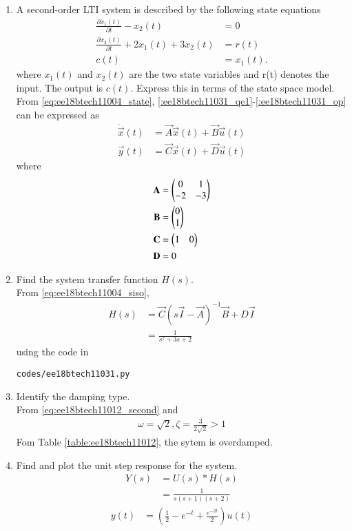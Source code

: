 \begin{enumerate}[label=\thesubsection.\arabic*.,ref=\thesubsection.\theenumi]

\item A second-order LTI system is described by the following state equations
\begin{align}
\label{:ee18btech11031_qe1}
\frac{\partial x_1(t)}{\partial t} - x_2(t) &= 0
\\
\label{:ee18btech11031_qe2}
\frac{\partial x_2(t)}{\partial t} + 2x_1(t) + 3x_2(t) &= r(t)
\\
c(t) &= x_1(t).
\label{:ee18btech11031_op}
\end{align}
%
where $x_1(t)$ and $x_2(t)$ are the two state variables and r(t) denotes the input. The output is $c(t)$.  Express this in terms of the state space model.
%
\\
\solution From \eqref{eq:ee18btech11004_state}, \eqref{:ee18btech11031_qe1}-\eqref{:ee18btech11031_op} can be expressed as
%
\begin{align}
\dot{\vec{x}}(t)&=\vec{A}\vec{x}(t)+\vec{B}\vec{u}(t) \\
 \vec{y}(t)&=\vec{C}\vec{x}(t)+\vec{D} \vec{u}(t)
\end{align}
%
where
\begin{align}
    \mathbf{A} &= \begin{pmatrix}0&1\\-2&-3\end{pmatrix}
\\
    \mathbf{B} &= \begin{pmatrix}0\\1\end{pmatrix}
\\
    \mathbf{C} &= \begin{pmatrix}1&0\end{pmatrix}
\\
    \mathbf{D} &= 0
\end{align}

\item Find the system transfer function $H(s)$.
%
\\
\solution From \eqref{eq:ee18btech11004_siso},
%
\begin{align}
H(s) &=  \vec{C}{(s\vec{I}-\vec{A})^{-1}}\vec{B}+D\vec{I}
\\
&  = \frac{1}{s^{2}+3s+2}
\label{eq:ee18btech11031_H}
\end{align}
%
using the code in 
\begin{lstlisting}
codes/ee18btech11031.py
\end{lstlisting}
%
\item Identify the damping type.
\\
\solution From \eqref{eq:ee18btech11012_second} and \label{eq:ee18btech11031_H}
%
\begin{align}
\omega = \sqrt{2}, \zeta = \frac{3}{2\sqrt{2}} > 1
\end{align}
Fom Table \ref{table:ee18btech11012}, the sytem is overdamped.
%
\item Find and plot the unit step response for the system.
\\
\solution 
\begin{align}
Y(s) &= U(s)*H(s)
\\
& = \frac{1}{s(s+1)(s+2)}
\end{align}
\begin{align}
y(t) &= (\frac{1}{2} - e^{-t} + \frac{e^{-2t}}{2})u(t)
\end{align}



\end{enumerate}
